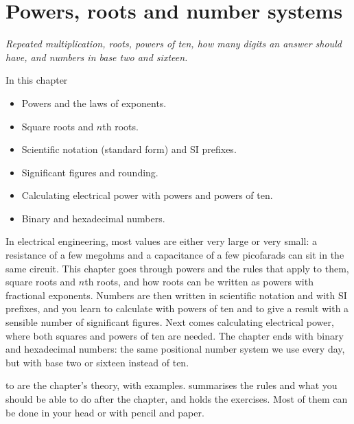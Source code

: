 
\chapter{Powers, roots and number systems}
\label{c5:ch}

{\large\itshape Repeated multiplication, roots, powers of ten, how many digits an answer should
have, and numbers in base two and sixteen.\par}

\begin{chapterbox}{In this chapter}
\begin{itemize}
  \item Powers and the laws of exponents.
  \item Square roots and $n$th roots.
  \item Scientific notation (standard form) and SI prefixes.
  \item Significant figures and rounding.
  \item Calculating electrical power with powers and powers of ten.
  \item Binary and hexadecimal numbers.
\end{itemize}
\end{chapterbox}

In electrical engineering, most values are either very large or very small: a resistance of a few
megohms and a capacitance of a few picofarads can sit in the same circuit. This chapter goes
through powers and the rules that apply to them, square roots and $n$th roots, and how roots can
be written as powers with fractional exponents. Numbers are then written in scientific notation
and with SI prefixes, and you learn to calculate with powers of ten and to give a result with a
sensible number of significant figures. Next comes calculating electrical power, where both
squares and powers of ten are needed. The chapter ends with binary and hexadecimal numbers: the
same positional number system we use every day, but with base two or sixteen instead of ten.

 to  are the chapter's theory, with examples.
 summarises the rules and what you should be able to do after the
chapter, and  holds the exercises. Most of them can be done in your head
or with pencil and paper.




